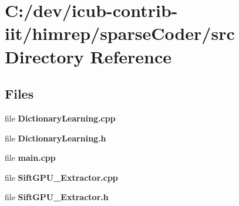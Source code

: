 \section{C\+:/dev/icub-\/contrib-\/iit/himrep/sparse\+Coder/src Directory Reference}
\label{dir_450f4e14c121c7353d5681dddc1704f8}
\subsection*{Files}
\begin{DoxyCompactItemize}
\item 
file {\bfseries Dictionary\+Learning.\+cpp}
\item 
file {\bfseries Dictionary\+Learning.\+h}
\item 
file {\bfseries main.\+cpp}
\item 
file {\bfseries Sift\+G\+P\+U\+\_\+\+Extractor.\+cpp}
\item 
file {\bfseries Sift\+G\+P\+U\+\_\+\+Extractor.\+h}
\end{DoxyCompactItemize}
